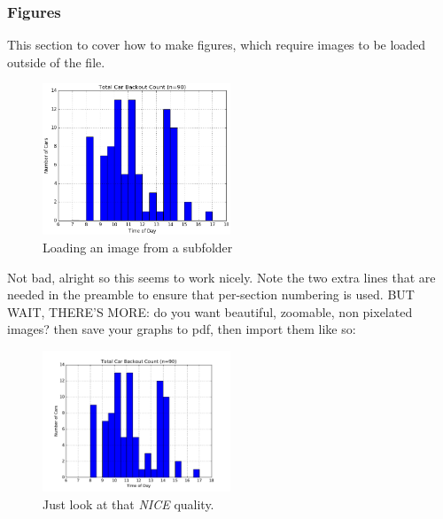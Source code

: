\documentclass[a4paper,12pt]{article} %
\begin{document}
\newpage
\subsubsection{Figures}
This section to cover how to make figures, which require images to be loaded outside of the file.

\begin{figure}[h] %
\centering
\includegraphics[width=0.5\textwidth]{media/img2.png} %
\caption{Loading an image from a subfolder}
\label{figure-parking}
\end{figure}

Not bad, alright so this seems to work nicely. Note the two extra lines that are needed in the preamble to ensure that per-section numbering is used. BUT WAIT, THERE'S MORE: do you want beautiful, zoomable, non pixelated images? then save your graphs to pdf, then import them like so:
\begin{figure}[h]
\centering
\includegraphics[width=0.5\textwidth]{media/result.pdf}
\caption{Just look at that \textit{NICE} quality.}	
\end{figure}
\end{document}
